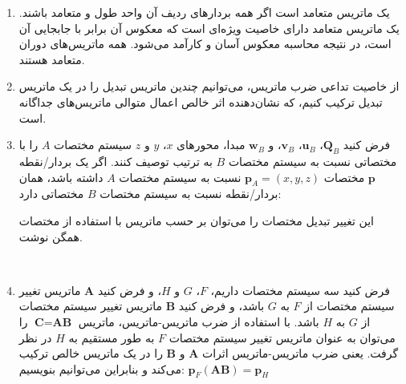 {\begin{spacing}{1.5}
\begin{enumerate}[label=\textbf{\arabic*}.]
            \item {یک ماتریس متعامد است اگر همه بردارهای ردیف آن واحد طول و متعامد باشند.
            یک ماتریس متعامد دارای خاصیت ویژه‌ای است که معکوس آن برابر با جابجایی آن است،
            در نتیجه محاسبه معکوس آسان و کارآمد می‌شود. همه ماتریس‌های دوران متعامد هستند.}  \\\textbf{\vspace{6pt}}

            \item {از خاصیت تداعی ضرب ماتریس، می‌توانیم چندین ماتریس تبدیل را در یک ماتریس تبدیل ترکیب کنیم، که نشان‌دهنده اثر خالص اعمال متوالی ماتریس‌های جداگانه است.}  \\\textbf{\vspace{6pt}}

            \item {فرض کنید $\textbf{Q}_{B}$، $\textbf{u}_{B}$، $\textbf{v}_{B}$، و $\textbf{w}_{B}$ مبدا، محورهای $x$، $y$ و $z$ سیستم مختصات $A$ را با مختصاتی نسبت به سیستم مختصات $B$ به ترتیب توصیف کنند.
            اگر یک بردار/نقطه $\textbf{p}$ مختصات $\textbf{p}_{A}=(x,y,z)$ نسبت به سیستم مختصات $A$ داشته باشد، همان بردار/نقطه نسبت به سیستم مختصات $B$ مختصاتی دارد:
                \begin{flushleft}
                \end{flushleft}
                این تغییر تبدیل مختصات را می‌توان بر حسب ماتریس با استفاده از مختصات همگن نوشت.
            }  \\\textbf{\vspace{6pt}}

            \item {فرض کنید سه سیستم مختصات داریم، $F$، $G$ و $H$، و فرض کنید $\textbf{A}$ ماتریس تغییر سیستم مختصات از $F$ به $G$ باشد، و فرض کنید $\textbf{B}$ ماتریس تغییر سیستم مختصات از $G$ به $H$ باشد.
            با استفاده از ضرب ماتریس-ماتریس، ماتریس $\textbf{C}=\textbf{AB}$ را می‌توان به عنوان ماتریس تغییر سیستم مختصات $F$ به طور مستقیم به $H$ در نظر گرفت.
            یعنی ضرب ماتریس-ماتریس اثرات $\textbf{A}$ و $\textbf{B}$ را در یک ماتریس خالص ترکیب می‌کند و بنابراین می‌توانیم بنویسیم:
                $\textbf{p}_{F}(\textbf{AB})=\textbf{p}_{H}$}  \\\textbf{\vspace{6pt}}


\end{enumerate}
\end{spacing}}
